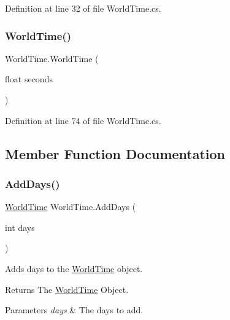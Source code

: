 Definition at line 32 of file World\+Time.\+cs.

\mbox{\label{struct_world_time_afcb648681751290a686d4459ece7a151}} 
\subsubsection{\texorpdfstring{World\+Time()}{WorldTime()}\hspace{0.1cm}{\footnotesize\ttfamily [3/3]}}
{\footnotesize\ttfamily World\+Time.\+World\+Time (\begin{DoxyParamCaption}\item[{float}]{seconds }\end{DoxyParamCaption})}



Definition at line 74 of file World\+Time.\+cs.



\subsection{Member Function Documentation}
\mbox{\label{struct_world_time_a59a7039e46bb8c3956a1341ca4ef74c1}} 
\subsubsection{\texorpdfstring{Add\+Days()}{AddDays()}}
{\footnotesize\ttfamily \hyperlink{struct_world_time}{World\+Time} World\+Time.\+Add\+Days (\begin{DoxyParamCaption}\item[{int}]{days }\end{DoxyParamCaption})}



Adds days to the \hyperlink{struct_world_time}{World\+Time} object. 

\begin{DoxyReturn}{Returns}
The \hyperlink{struct_world_time}{World\+Time} Object.
\end{DoxyReturn}

\begin{DoxyParams}{Parameters}
{\em days} & The days to add.\\
\hline
\end{DoxyParams}


